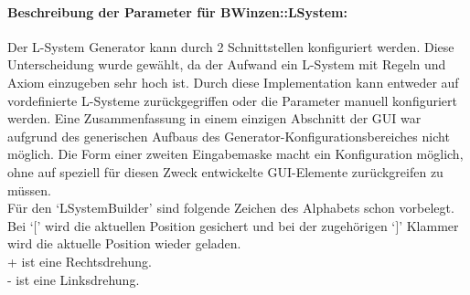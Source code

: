 \documentclass[../mciAusarbeitung.tex]{subfiles}
\begin{document}
\paragraph{Beschreibung der Parameter für BWinzen::LSystem:}
	Der L-System Generator kann durch 2 Schnittstellen konfiguriert werden. Diese Unterscheidung wurde gewählt, da der Aufwand ein L-System mit Regeln und Axiom einzugeben sehr hoch ist. Durch diese Implementation kann entweder auf vordefinierte L-Systeme zurückgegriffen oder die Parameter manuell konfiguriert werden. Eine Zusammenfassung in einem einzigen Abschnitt der GUI war aufgrund des generischen Aufbaus des Generator-Konfigurationsbereiches nicht möglich. Die Form einer zweiten Eingabemaske macht ein Konfiguration möglich, ohne auf speziell für diesen Zweck entwickelte GUI-Elemente zurückgreifen zu müssen.\\
	Für den `LSystemBuilder' sind folgende Zeichen des Alphabets schon vorbelegt.\\
	Bei `$[$' wird die aktuellen Position gesichert und bei der zugehörigen `$]$' Klammer wird die aktuelle Position wieder geladen.\\
	\indent + ist eine Rechtsdrehung.\\
	\indent - ist eine Linksdrehung.\\
\end{document}
